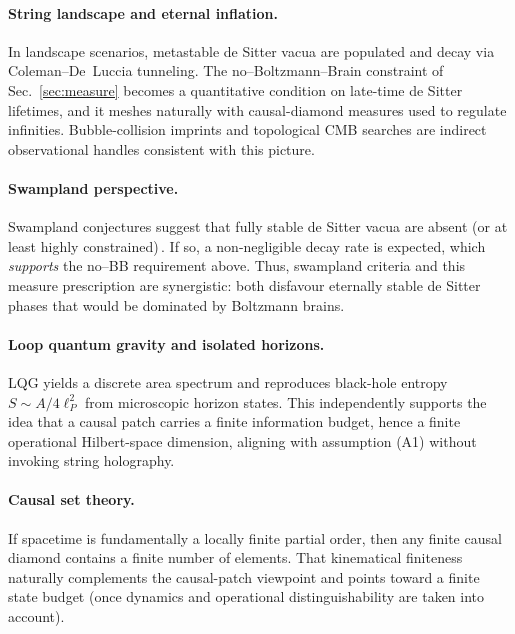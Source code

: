 \documentclass[12pt]{article}
\theoremstyle{remark}
\begin{document}
\paragraph{String landscape and eternal inflation.}
In landscape scenarios, metastable de Sitter vacua are populated and decay via Coleman–De~Luccia tunneling. The no--Boltzmann--Brain constraint of Sec.~\ref{sec:measure} becomes a quantitative condition on late-time de Sitter lifetimes, and it meshes naturally with causal-diamond measures used to regulate infinities. Bubble-collision imprints and topological CMB searches are indirect observational handles consistent with this picture.

\paragraph{Swampland perspective.}
Swampland conjectures suggest that fully stable de Sitter vacua are absent (or at least highly constrained)\,\cite{Obied2018,Ooguri2019}. If so, a non-negligible decay rate is expected, which \emph{supports} the no--BB requirement above. Thus, swampland criteria and this measure prescription are synergistic: both disfavour eternally stable de Sitter phases that would be dominated by Boltzmann brains.

\paragraph{Loop quantum gravity and isolated horizons.}
LQG yields a discrete area spectrum and reproduces black-hole entropy $S\!\sim\!A/4\ell_P^2$ from microscopic horizon states. This independently supports the idea that a causal patch carries a finite information budget, hence a finite operational Hilbert-space dimension, aligning with assumption (A1) without invoking string holography.

\paragraph{Causal set theory.}
If spacetime is fundamentally a locally finite partial order, then any finite causal diamond contains a finite number of elements. That kinematical finiteness naturally complements the causal-patch viewpoint and points toward a finite state budget (once dynamics and operational distinguishability are taken into account).

\end{document}
